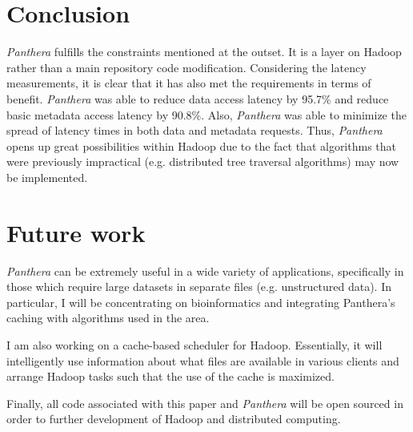 \documentclass[12pt]{article}
\begin{document}
\section{Conclusion}

\textit{Panthera} fulfills the constraints mentioned at the outset. It is a layer on Hadoop rather than a main repository code modification. Considering the latency measurements, it is clear that it has also met the requirements in terms of benefit. \textit{Panthera} was able to reduce data access latency by 95.7\% and reduce basic metadata access latency by 90.8\%. Also, \textit{Panthera} was able to minimize the spread of latency times in both data and metadata requests. Thus, \textit{Panthera} opens up great possibilities within Hadoop due to the fact that algorithms that were previously impractical (e.g. distributed tree traversal algorithms) may now be implemented.

\section{Future work}
\textit{Panthera} can be extremely useful in a wide variety of applications, specifically in those which require large datasets in separate files (e.g. unstructured data). In particular, I will be concentrating on bioinformatics and integrating Panthera's caching with algorithms used in the area.

I am also working on a cache-based scheduler for Hadoop. Essentially, it will intelligently use information about what files are available in various clients and arrange Hadoop tasks such that the use of the cache is maximized.

Finally, all code associated with this paper and \textit{Panthera} will be open sourced in order to further development of Hadoop and distributed computing.

\nocite{*}



\end{document}
